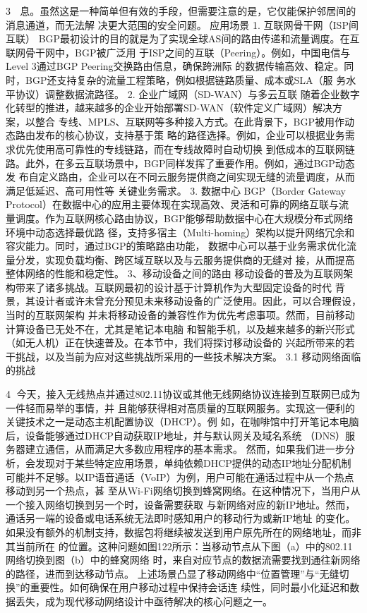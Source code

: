                                                                   3
  息。虽然这是一种简单但有效的手段，但需要注意的是，它仅能保护邻居间的消息通道，而无法解
  决更大范围的安全问题。
应用场景
1. 互联网骨干网（ISP间互联）
BGP最初设计的目的就是为了实现全球AS间的路由传递和流量调度。在互联网骨干网中，BGP被广泛用
于ISP之间的互联（Peering）。例如，中国电信与Level 3通过BGP Peering交换路由信息，确保跨洲际
的数据传输高效、稳定。同时，BGP还支持复杂的流量工程策略，例如根据链路质量、成本或SLA（服
务水平协议）调整数据流路径。
2. 企业广域网（SD-WAN）与多云互联
随着企业数字化转型的推进，越来越多的企业开始部署SD-WAN（软件定义广域网）解决方案，以整合
专线、MPLS、互联网等多种接入方式。在此背景下，BGP被用作动态路由发布的核心协议，支持基于策
略的路径选择。例如，企业可以根据业务需求优先使用高可靠性的专线链路，而在专线故障时自动切换
到低成本的互联网链路。此外，在多云互联场景中，BGP同样发挥了重要作用。例如，通过BGP动态发
布自定义路由，企业可以在不同云服务提供商之间实现无缝的流量调度，从而满足低延迟、高可用性等
关键业务需求。
3. 数据中心
BGP（Border Gateway Protocol）在数据中心的应用主要体现在实现高效、灵活和可靠的网络互联与流
量调度。作为互联网核心路由协议，BGP能够帮助数据中心在大规模分布式网络环境中动态选择最优路
径，支持多宿主（Multi-homing）架构以提升网络冗余和容灾能力。同时，通过BGP的策略路由功能，
数据中心可以基于业务需求优化流量分发，实现负载均衡、跨区域互联以及与云服务提供商的无缝对
接，从而提高整体网络的性能和稳定性。
3、移动设备之间的路由
移动设备的普及为互联网架构带来了诸多挑战。互联网最初的设计基于计算机作为大型固定设备的时代
背景，其设计者或许未曾充分预见未来移动设备的广泛使用。因此，可以合理假设，当时的互联网架构
并未将移动设备的兼容性作为优先考虑事项。然而，目前移动计算设备已无处不在，尤其是笔记本电脑
和智能手机，以及越来越多的新兴形式（如无人机）正在快速普及。在本节中，我们将探讨移动设备的
兴起所带来的若干挑战，以及当前为应对这些挑战所采用的一些技术解决方案。
3.1 移动网络面临的挑战

                                                          4
今天，接入无线热点并通过802.11协议或其他无线网络协议连接到互联网已成为一件轻而易举的事情，并
且能够获得相对高质量的互联网服务。实现这一便利的关键技术之一是动态主机配置协议（DHCP）。例
如，在咖啡馆中打开笔记本电脑后，设备能够通过DHCP自动获取IP地址，并与默认网关及域名系统
（DNS）服务器建立通信，从而满足大多数应用程序的基本需求。
然而，如果我们进一步分析，会发现对于某些特定应用场景，单纯依赖DHCP提供的动态IP地址分配机制
可能并不足够。以IP语音通话（VoIP）为例，用户可能在通话过程中从一个热点移动到另一个热点，甚
至从Wi-Fi网络切换到蜂窝网络。在这种情况下，当用户从一个接入网络切换到另一个时，设备需要获取
与新网络对应的新IP地址。然而，通话另一端的设备或电话系统无法即时感知用户的移动行为或新IP地址
的变化。如果没有额外的机制支持，数据包将继续被发送到用户原先所在的网络地址，而非其当前所在
的位置。这种问题如图122所示：当移动节点从下图（a）中的802.11网络切换到图（b）中的蜂窝网络
时，来自对应节点的数据流需要找到通往新网络的路径，进而到达移动节点。
上述场景凸显了移动网络中“位置管理”与“无缝切换”的重要性。如何确保在用户移动过程中保持会话连
续性，同时最小化延迟和数据丢失，成为现代移动网络设计中亟待解决的核心问题之一。




